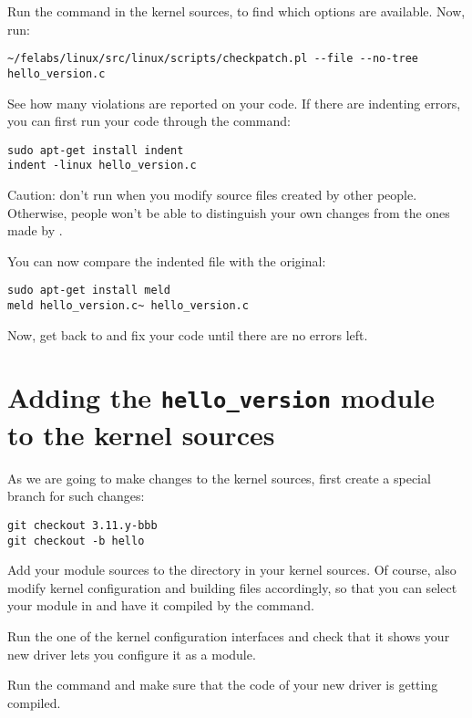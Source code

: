 Run the  command in the kernel sources,
to find which options are available.  Now, run:

\begin{verbatim}
~/felabs/linux/src/linux/scripts/checkpatch.pl --file --no-tree hello_version.c
\end{verbatim}

See how many violations are reported on your code. If there are
indenting errors, you can first run your code through the 
command:

\begin{verbatim}
sudo apt-get install indent
indent -linux hello_version.c
\end{verbatim}

Caution: don't run  when you modify source files created
by other people. Otherwise, people won't be able to distinguish your own
changes from the ones made by .

You can now compare the indented file with the original:

\begin{verbatim}
sudo apt-get install meld
meld hello_version.c~ hello_version.c
\end{verbatim}

Now, get back to  and fix your code until there are
no errors left.

\section{Adding the {\tt hello\_version} module to the kernel sources}

As we are going to make changes to the kernel sources, first create a
special branch for such changes:

\begin{verbatim}
git checkout 3.11.y-bbb
git checkout -b hello
\end{verbatim}

Add your module sources to the  directory in your
kernel sources. Of course, also modify kernel configuration and
building files accordingly, so that you can select your module in
 and have it compiled by the  command.

Run the one of the kernel configuration interfaces and check that it
shows your new driver lets you configure it as a module.

Run the  command and make sure that the code of your new
driver is getting compiled. 

